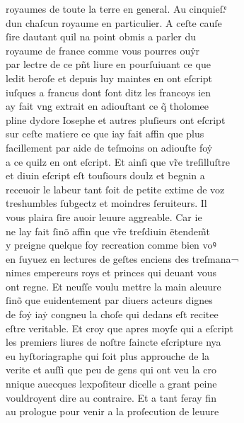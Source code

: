 \documentclass[12pt]{article}
\begin{document}
\newpage
royaumes de toute la terre en general. Au
            cinquieſ.ͤ\\
dun chaſcun royaume en particulier. A ceſte cauſe\\
ſire
          dautant quil na point obmis a parler du\\
royaume de france comme vous pourres
            ouẏr\\
par lectre de ce pñt liure en pourſuiuant ce que\\
ledit
            beroſe et depuis luy maintes en ont eſcript\\
iuſques a francus dont ſont ditz les
          francoys ien\\
ay fait vng extrait en adiouſtant ce q̃ tholomee\\
 pline dydore Iosephe et autres pluſieurs ont eſcript\\
sur ceſte matiere ce que iay fait affin que plus\\
facillement par aide
          de teſmoins on adiouſte foẏ\\
a ce quilz en ont eſcript. Et ainſi que vr̃e
            treſilluſtre\\
et diuin eſcript eſt touſiours doulz et begnin a\\
receuoir le labeur tant ſoit de petite extime de voz\\
treshumbles ſubgectz et
          moindres ſeruiteurs. Il\\
vous plaira ſire auoir leuure aggreable. Car ie\\
ne lay fait ſinõ affin que vr̃e treſdiuin ẽtendem̃t\\
y preigne
          quelque foy recreation comme bien voꝰ\\
en ſuyuez en lectures de geſtes enciens
          des treſmana¬\\
nimes empereurs roys et princes qui deuant vous\\
ont
          regne. Et neuſſe voulu mettre la main aleuure\\
ſinõ que euidentement par diuers
          acteurs dignes\\
de foẏ iaẏ congneu la choſe qui dedans eſt recitee\\
eſtre veritable. Et croy que apres moyſe qui a eſcript\\
les premiers liures de noſtre ſaincte eſcripture
            nya\\
eu hyſtoriagraphe qui ſoit plus approuche de la\\
verite et
          auſſi que peu de gens qui ont veu la cro\\
nnique auecques lexpoſiteur dicelle a grant peine\\
vouldroyent dire au
          contraire. Et a tant feray fin\\
au prologue pour venir a la proſecution de
          leuure
\end{document}
